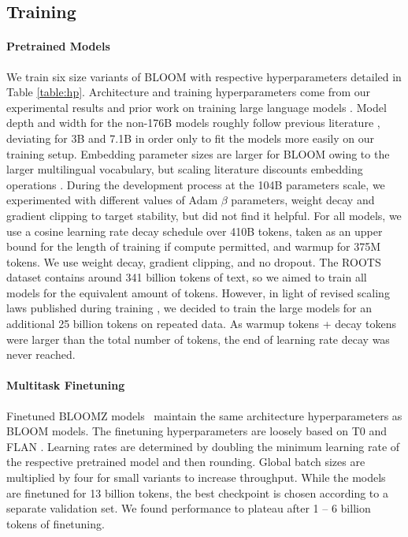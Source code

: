 \subsection{Training}
\label{sec:training}

\paragraph{Pretrained Models} We train six size variants of BLOOM with respective hyperparameters detailed in Table \ref{table:hp}. Architecture and training hyperparameters come from our experimental results \citep{scao2022what} and prior work on training large language models \citep{brown2020language,kaplan2020scaling}. Model depth and width for the non-176B models roughly follow previous literature \citep{brown2020language, zhang2022opt}, deviating for 3B and 7.1B in order only to fit the models more easily on our training setup. Embedding parameter sizes are larger for BLOOM owing to the larger multilingual vocabulary, but scaling literature discounts embedding operations \citep{kaplan2020scaling}. During the development process at the 104B parameters scale, we experimented with different values of Adam $\beta$ parameters, weight decay and gradient clipping to target stability, but did not find it helpful. For all models, we use a cosine learning rate decay schedule \citep{loschchilovcosinedecay} over 410B tokens, taken as an upper bound for the length of training if compute permitted, and warmup for 375M tokens. We use weight decay, gradient clipping, and no dropout. The ROOTS dataset contains around 341 billion tokens of text, so we aimed to train all models for the equivalent amount of tokens. However, in light of revised scaling laws published during training \citep{hoffmann2022training}, we decided to train the large models for an additional 25 billion tokens on repeated data. As warmup tokens + decay tokens were larger than the total number of tokens, the end of learning rate decay was never reached.

\paragraph{Multitask Finetuning} Finetuned BLOOMZ models~\citep{muennighoff2022crosslingual} maintain the same architecture hyperparameters as BLOOM models. The finetuning hyperparameters are loosely based on T0 \citep{sanh2022multitask} and FLAN \citep{wei2021finetuned}. Learning rates are determined by doubling the minimum learning rate of the respective pretrained model and then rounding. Global batch sizes are multiplied by four for small variants to increase throughput. While the models are finetuned for 13 billion tokens, the best checkpoint is chosen according to a separate validation set. We found performance to plateau after 1 -- 6 billion tokens of finetuning.

